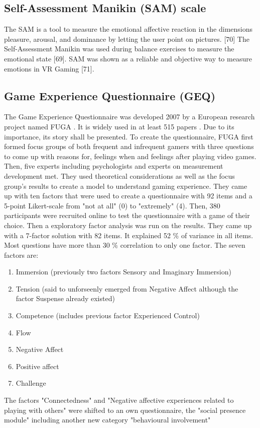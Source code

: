 \subsection{Self-Assessment Manikin (SAM) scale}
The SAM is a tool to measure the emotional affective reaction in the dimensions pleasure, arousal, and dominance by letting the user point on pictures. [70] The Self-Assessment Manikin was used during balance exercises to measure the emotional state [69]. SAM was shown as a reliable and objective way to measure
emotions in VR Gaming [71].

\subsection{Game Experience Questionnaire (GEQ)}
The Game Experience Questionnaire was developed 2007 by a European research project named FUGA \cite{law2018systematic}. It is widely used in at least 515 papers \cite{law2018systematic}. Due to its importance, its story shall be presented. 
To create the questionnaire, FUGA first formed focus groups of both frequent and infrequent gamers with three questions to come up with reasons for, feelings when and feelings after playing video games. Then, five experts including psychologists and experts on measurement development met. They used theoretical considerations as well as the focus group's results to create a model to understand gaming experience. They came up with ten factors that were used to create a questionnaire with 92 items and a 5-point Likert-scale from "not at all" (0) to "extremely" (4).
Then, 380 participants were recruited online to test the questionnaire with a game of their choice. Then a exploratory factor analysis was run on the results. They came up with a 7-factor solution with 82 items. It explained 52 \% of variance in all items. Most questions have more than 30 \% correlation to only one factor. The seven factors are:
\begin{enumerate}
	\item Immersion (previously two factors Sensory and Imaginary Immersion)
	\item Tension (said to unforseenly emerged from Negative Affect although the factor Suspense already existed)
	\item Competence (includes previous factor Experienced Control)
	\item Flow
	\item Negative Affect
	\item Positive affect
	\item Challenge
\end{enumerate}
The factors "Connectedness" and "Negative affective experiences related to playing with others" were shifted to an own questionnaire, the "social presence module" including another new category "behavioural involvement" 

